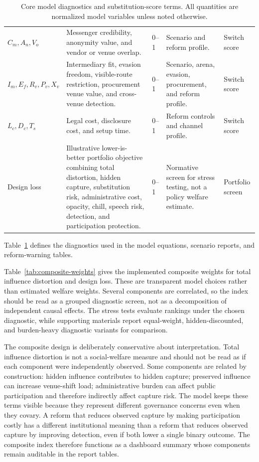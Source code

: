 \begin{table}[tbp]
\begin{tabular}{p{}p{}p{}p{}p{}}
\(C_m,A_n,V_o\) & Messenger credibility, anonymity value, and vendor or venue overlap. & 0--1 & Scenario and reform profile. & Switch score \\
\(I_m,E_f,R_v,P_v,X_v\) & Intermediary fit, evasion freedom, visible-route restriction, procurement venue value, and cross-venue detection. & 0--1 & Scenario, arena, evasion, procurement, and reform profile. & Switch score \\
\(L_c,D_c,T_s\) & Legal cost, disclosure cost, and setup time. & 0--1 & Reform controls and channel profile. & Switch score \\
Design loss & Illustrative lower-is-better portfolio objective combining total distortion, hidden capture, substitution risk, administrative cost, opacity, chill, speech risk, detection, and participation protection. & 0--1 & Normative screen for stress testing, not a policy welfare estimate. & Portfolio screen \\
\bottomrule
\end{tabular}
\caption{Core model diagnostics and substitution-score terms. All quantities are normalized model variables unless noted otherwise.}
\label{tab:model-specification}
\end{table}

Table~\ref{tab:model-specification} defines the diagnostics used in the model equations, scenario reports, and reform-warning tables.

Table~\ref{tab:composite-weights} gives the implemented composite weights for total influence distortion and design loss. These are transparent model choices rather than estimated welfare weights. Several components are correlated, so the index should be read as a grouped diagnostic screen, not as a decomposition of independent causal effects. The stress tests evaluate rankings under the chosen diagnostic, while supporting materials report equal-weight, hidden-discounted, and burden-heavy diagnostic variants for comparison.



The composite design is deliberately conservative about interpretation. Total influence distortion is not a social-welfare measure and should not be read as if each component were independently observed. Some components are related by construction: hidden influence contributes to hidden capture; preserved influence can increase venue-shift load; administrative burden can affect public participation and therefore indirectly affect capture risk. The model keeps these terms visible because they represent different governance concerns even when they covary. A reform that reduces observed capture by making participation costly has a different institutional meaning than a reform that reduces observed capture by improving detection, even if both lower a single binary outcome. The composite index therefore functions as a dashboard summary whose components remain auditable in the report tables.

